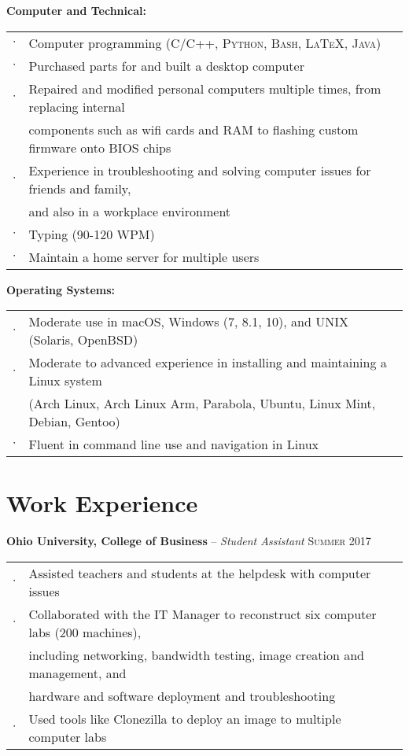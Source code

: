 \documentclass[letterpaper,12pt]{article}
\begin{document}
\textbf{Computer and Technical:}

\begin{tabular}{rl}
$\cdot$ & Computer programming (\textsc{C/C++, Python, Bash, \LaTeX, Java}) \\
$\cdot$ & Purchased parts for and built a desktop computer \\
$\cdot$ & Repaired and modified personal computers multiple times, from replacing internal \\
        & components such as wifi cards and RAM to flashing custom firmware onto BIOS chips \\
$\cdot$ & Experience in troubleshooting and solving computer issues for friends and family, \\
        & and also in a workplace environment \\
$\cdot$ & Typing (90-120 WPM) \\
$\cdot$ & Maintain a home server for multiple users \\
\end{tabular}

\textbf{Operating Systems:}

\begin{tabular}{rl}
$\cdot$ & Moderate use in macOS, Windows (7, 8.1, 10), and UNIX (Solaris, OpenBSD) \\
$\cdot$ & Moderate to advanced experience in installing and maintaining a Linux system \\
& (Arch Linux, Arch Linux Arm, Parabola, Ubuntu, Linux Mint, Debian, Gentoo)\\
$\cdot$ & Fluent in command line use and navigation in Linux \\
\end{tabular}

\section{Work Experience}

\textbf{Ohio University, College of Business} -- \textit{Student Assistant} \hfill \textsc{Summer 2017}

\begin{tabular}{rl}
$\cdot$ & Assisted teachers and students at the helpdesk with computer issues \\
$\cdot$ & Collaborated with the IT Manager to reconstruct six computer labs (200 machines), \\
        & including networking, bandwidth testing, image creation and management, and \\
        & hardware and software deployment and troubleshooting \\
$\cdot$ & Used tools like Clonezilla to deploy an image to multiple computer labs \\
\end{tabular}
\end{document}
